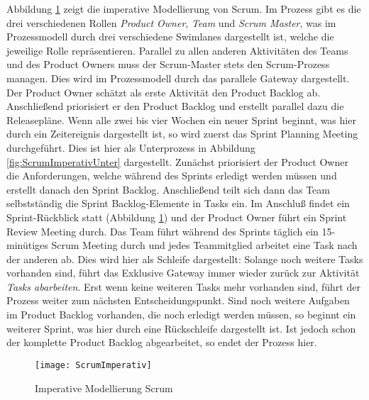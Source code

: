 Abbildung \ref{fig:ScrumImperativ} zeigt die imperative Modellierung von Scrum. \newline
Im Prozess gibt es die drei verschiedenen Rollen \textit{Product Owner}, \textit{Team} und \textit{Scrum Master}, was im Prozessmodell durch drei verschiedene Swimlanes dargestellt ist, welche die jeweilige Rolle repräsentieren.\newline
Parallel zu allen anderen Aktivitäten des Teams und des Product Owners muss der Scrum-Master stets den Scrum-Prozess managen. Dies wird im Prozessmodell durch das parallele Gateway dargestellt. \newline
Der Product Owner schätzt als erste Aktivität den Product Backlog ab. Anschließend priorisiert er den Product Backlog und erstellt parallel dazu die Releasepläne. \newline
Wenn alle zwei bis vier Wochen ein neuer Sprint beginnt, was hier durch ein Zeitereignis dargestellt ist, so wird zuerst das Sprint Planning Meeting durchgeführt. Dies ist hier als Unterprozess in Abbildung \ref{fig:ScrumImperativUnter} dargestellt. Zunächst priorisiert der Product Owner die Anforderungen, welche während des Sprints erledigt werden müssen und erstellt danach den Sprint Backlog. Anschließend teilt sich dann das Team selbstständig die Sprint Backlog-Elemente in Tasks ein.\newline
Im Anschluß findet ein Sprint-Rückblick statt (Abbildung \ref{fig:ScrumImperativ}) und der Product Owner führt ein Sprint Review Meeting durch.\newline
Das Team führt während des Sprints täglich ein 15-minütiges Scrum Meeting durch und jedes Teammitglied arbeitet eine Task nach der anderen ab. Dies wird hier als Schleife dargestellt: Solange noch weitere Tasks vorhanden sind, führt das Exklusive Gateway immer wieder zurück zur Aktivität \textit{Tasks abarbeiten}. Erst wenn keine weiteren Tasks mehr vorhanden sind, führt der Prozess weiter zum nächsten Entscheidungspunkt.\newline
Sind noch weitere Aufgaben im Product Backlog vorhanden, die noch erledigt werden müssen, so beginnt ein weiterer Sprint, was hier durch eine Rückschleife dargestellt ist. Ist jedoch schon der komplette Product Backlog abgearbeitet, so endet der Prozess hier.


\begin{figure}[htp]
\begin{center}
  \texttt{[image: ScrumImperativ]} %
  \caption{Imperative Modellierung Scrum}
  \label{fig:ScrumImperativ}
\end{center}
\end{figure}

